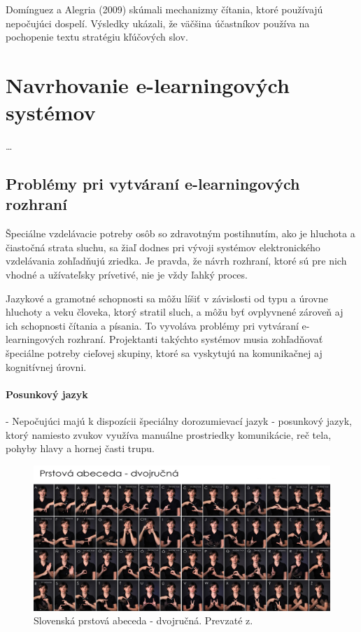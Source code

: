 \documentclass[10pt,oneside,slovak,a4paper]{article}
\begin{document}
Domínguez a Alegria (2009) skúmali mechanizmy čítania, ktoré používajú nepočujúci dospelí. Výsledky ukázali, že väčšina účastníkov používa na pochopenie textu stratégiu kľúčových slov\cite{dominguez2010reading}. 

\section{Navrhovanie e-learningových systémov} \label{navrhovanie}
\ldots
\subsection{Problémy pri vytváraní e-learningových rozhraní} \label{navrhovanie:problemy}
Špeciálne vzdelávacie potreby osôb so zdravotným postihnutím, ako je hluchota a čiastočná strata sluchu, sa žiaľ dodnes pri vývoji systémov elektronického vzdelávania zohľadňujú zriedka. Je pravda, že návrh rozhraní, ktoré sú pre nich vhodné a užívateľsky prívetivé, nie je vždy ľahký proces.

Jazykové a gramotné schopnosti sa môžu líšiť v závislosti od typu a úrovne hluchoty a veku človeka, ktorý stratil sluch, a môžu byť ovplyvnené zároveň aj ich schopnosti čítania a písania. To vyvoláva problémy pri vytváraní e-learningových rozhraní. Projektanti takýchto systémov musia zohľadňovať špeciálne potreby cieľovej skupiny, ktoré sa vyskytujú na komunikačnej aj kognitívnej úrovni.\cite{pappas2018learning}
\paragraph{Posunkový jazyk}- Nepočujúci majú k dispozícii špeciálny dorozumievací jazyk - posunkový jazyk, ktorý namiesto zvukov využíva manuálne prostriedky komunikácie, reč tela, pohyby hlavy a hornej časti trupu.
\begin{figure}[H]
   \includegraphics[scale=0.15]{dvojrucnaabeceda.jpg}
\centering
\caption{Slovenská prstová abeceda - dvojručná. Prevzaté z\cite{mytyafakty}.}

\label{slovenskaposunkovarec}
\end{figure}
\end{document}
